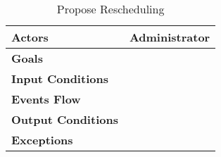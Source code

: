 \begin{table}[H]
	\centering
	\def\arraystretch{1.5}
	\begin{tabular}{|p{7cm}|p{7cm}|}
		\hline
		\textbf{Actors}            & Administrator    \\ \hline
		\textbf{Goals}             &            \\ \hline
		\textbf{Input Conditions}  &            \\ \hline
		\textbf{Events Flow}       &            \\ \hline
		\textbf{Output Conditions} &            \\ \hline
		\textbf{Exceptions}        &            \\ \hline
	\end{tabular}
	\caption{Propose Rescheduling}
\end{table}